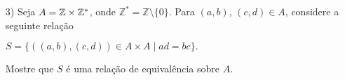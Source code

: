 \documentclass{beamer}
\begin{document}
    \begin{frame}
    \end{frame}
    \begin{frame}
    \end{frame}
    \begin{frame}
        \begin{exemplos}
            \begin{itemize}[label={\arabic*})]
                \item[3)] Seja $A = \mathbb{Z} \times \mathbb{Z}^*$, onde $\mathbb{Z}^* = \mathbb{Z} \setminus \{0\}$. \pause  Para $(a, b)$, $(c, d) \in A$, \pause considere a seguinte rela{\c c}{\~a}o\pause
                \begin{center}
                    $S = \{((a, b), (c, d)) \in A \times A \mid ad = bc\}.$
                \end{center}
                Mostre que $S$ \'e uma rela{\c c}{\~a}o de equival{\^e}ncia sobre $A$.\pause
            \end{itemize}
        \end{exemplos}
        \vspace{3cm}
    \end{frame}
    \begin{frame}
    \end{frame}
    \begin{frame}
    \end{frame}
    \begin{frame}
    \end{frame}
\end{document}
